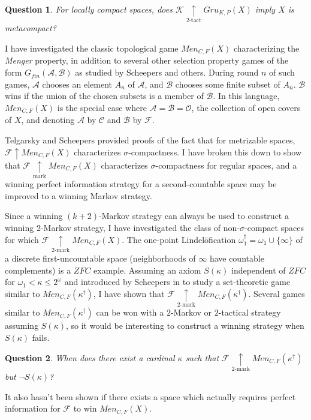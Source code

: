\documentclass[11pt]{amsart}
\theoremstyle{plain}
\newtheorem{question}{Question}
\newcommand{\win}{\uparrow}
\newcommand{\markwin}{\underset{\text{mark}}{\uparrow}}
\newcommand{\kmarkwin}[1]{\underset{#1\text{-mark}}{\uparrow}}
\newcommand{\ktactwin}[1]{\underset{#1\text{-tact}}{\uparrow}}
\newcommand{\oneptlind}[1]{#1^\dagger}
\newcommand{\gruKPGame}[1]{Gru_{K,P}(#1)}
\newcommand{\menGame}[1]{Men_{C,F}(#1)}
\newcommand{\<}{\langle}
\renewcommand{\>}{\rangle}
\newcommand{\mc}[1]{\mathcal{#1}}
\newcommand{\alcompS}[1]{S(#1)}
\newcommand{\pl}[1]{\mathscr{#1}}
\newcommand{\term}{\textit}
\begin{document}
\begin{question}
  For locally compact spaces,
  does $\pl K\ktactwin{2}\gruKPGame{X}$ imply
  $X$ is metacompact?
\end{question}

I have investigated the classic topological game $\menGame{X}$
characterizing the \term{Menger} property, in addition to several other
selection property games of the form $G_{fin}(\mc A,\mc B)$ as studied
by Scheepers \cite{MR1378387} and others.
During round $n$ of such games, $\pl A$ chooses an element $A_n$ of $\mc A$,
and $\pl B$ chooses some finite subset of $A_n$.
$\pl B$ wins if the union of the chosen
subsets is a member of $\mc B$. In this language, $\menGame{X}$ is the special
case where $\mc A=\mc B=\mc O$, the collection of open covers of $X$,
and denoting $\pl A$ by $\pl C$ and $\pl B$ by $\pl F$.

Telgarsky \cite{MR753073} and Scheepers \cite{MR1273523} provided proofs of
the fact that for metrizable spaces, $\pl F\win\menGame{X}$
characterizes $\sigma$-compactness. I have broken this down to show that
$\pl F\markwin\menGame{X}$ characterizes $\sigma$-compactness for regular
spaces, and a winning perfect information strategy for a second-countable
space may be improved to a winning Markov strategy.

Since a winning $(k+2)$-Markov strategy can always be used to construct a
winning $2$-Markov strategy, I have investigated the class of
non-$\sigma$-compact spaces for which $\pl F\kmarkwin{2}\menGame{X}$.
The one-point Lindel\"ofication $\oneptlind\omega_1=\omega_1\cup\{\infty\}$
of a discrete first-uncountable space (neighborhoods of $\infty$ have countable
complements) is a $ZFC$ example. Assuming an axiom $\alcompS\kappa$
independent of $ZFC$ for $\omega_1<\kappa\leq 2^\omega$
and introduced by Scheepers in \cite{MR1129143}
to study a set-theoretic game similar to $\menGame{\oneptlind\kappa}$,
I have shown that $\pl F\kmarkwin{2}\menGame{\oneptlind\kappa}$. Several
games similar to $\menGame{\oneptlind\kappa}$ can be won with a $2$-Markov
or $2$-tactical strategy assuming $\alcompS\kappa$, so it would be interesting
to construct a winning strategy when $\alcompS\kappa$ fails.

\begin{question}
  When does there exist a cardinal $\kappa$ such that
  $\pl F\kmarkwin{2}\menGame{\oneptlind\kappa}$ but $\neg\alcompS\kappa$?
\end{question}

It also hasn't been shown if there exists a space which actually requires
perfect information for $\pl F$ to win $\menGame{X}$.
\end{document}
